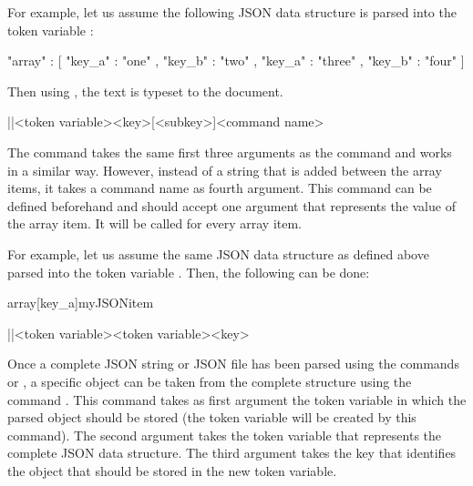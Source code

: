 \documentclass[a4paper]{article}
\begin{document}
For example, let us assume the following JSON data structure is parsed into the token variable \macro{\myJSONdata}:

\begin{codeexample}
{
  "array" : [
    {
      "key_a" : "one" ,
      "key_b" : "two"
    } ,
    {
      "key_a" : "three" ,
      "key_b" : "four"
    }
  ]
}
\end{codeexample}

Then using , the text  is typeset to the document. 

\begin{macrodef}
|\JSONParseUseArrayValues|{<token variable>}{<key>}[<subkey>]{<command name>}
\end{macrodef}
The command \macro{\JSONParseUseArrayValues} takes the same first three arguments as the command \macro{\JSONParseGetArrayValues} and works in a similar way. However, instead of a string that is added between the array items, it takes a command name as fourth argument. This command can be defined beforehand and should accept one argument that represents the value of the array item. It will be called for every array item.

For example, let us assume the same JSON data structure as defined above parsed into the token variable \macro{\myJSONdata}. Then, the following can be done:


\begin{codeexamplecolumns}
\newcommand{\myJSONitem}[1]{
  \item \emph{#1}
}

\begin{itemize}
  \JSONParseUseArrayValues{\myJSONdata}
    {array}[key_a]{myJSONitem}
\end{itemize}
\end{codeexamplecolumns}

\begin{macrodef}
|\JSONParseObject|{<token variable>}{<token variable>}{<key>}
\end{macrodef}
Once a complete JSON string or JSON file has been parsed using the commands \macro{\JSONParse} or \macro{\JSONParseFromFile}, a specific object can be taken from the complete structure using the command \macro{\JSONParseObject}. This command takes as first argument the token variable in which the parsed object should be stored (the token variable will be created by this command). The second argument takes the token variable that represents the complete JSON data structure. The third argument takes the key that identifies the object that should be stored in the new token variable.
\end{document}
